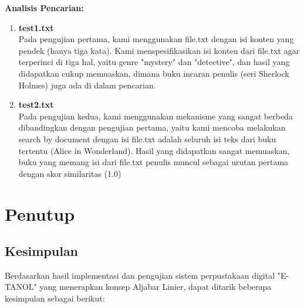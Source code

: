 \documentclass[12pt,a4paper]{article}
\begin{document}
\textbf{Analisis Pencarian:}
\begin{enumerate}
\item \textbf{test1.txt} \\
    Pada pengujian pertama, kami menggunakan file.txt dengan isi konten yang pendek (hanya tiga kata). Kami menspesifikasikan isi konten dari file.txt agar terperinci di tiga hal, yaitu genre "mystery" dan "detective", dan hasil yang didapatkan cukup memuaskan, dimana buku incaran penulis (seri Sherlock Holmes) juga ada di dalam pencarian.

    \item \textbf{test2.txt} \\
    Pada pengujian kedua, kami menggunakan mekanisme yang sangat berbeda dibandingkan dengan pengujian pertama, yaitu kami mencoba melakukan search by document dengan isi file.txt adalah seluruh isi teks dari buku tertentu (Alice in Wonderland). Hasil yang didapatkan sangat memuaskan, buku yang memang isi dari file.txt penulis muncul sebagai urutan pertama dengan skor similaritas (1.0)
\end{enumerate}

\newpage
\section{Penutup}
\subsection{Kesimpulan}
Berdasarkan hasil implementasi dan pengujian sistem perpustakaan digital "E-TANOL" yang menerapkan konsep Aljabar Linier, dapat ditarik beberapa kesimpulan sebagai berikut:
\end{document}
